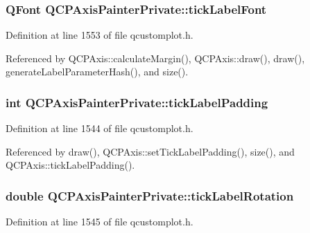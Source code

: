 \subsubsection[{tick\+Label\+Font}]{\setlength{\rightskip}{0pt plus 5cm}Q\+Font Q\+C\+P\+Axis\+Painter\+Private\+::tick\+Label\+Font}\label{class_q_c_p_axis_painter_private_a06cb4b185feb1e560e01d65887e4d80d}


Definition at line 1553 of file qcustomplot.\+h.



Referenced by Q\+C\+P\+Axis\+::calculate\+Margin(), Q\+C\+P\+Axis\+::draw(), draw(), generate\+Label\+Parameter\+Hash(), and size().

\hypertarget{class_q_c_p_axis_painter_private_a264cfa080e84e536cf2d1ab9c5d5cc5f}{}
\subsubsection[{tick\+Label\+Padding}]{\setlength{\rightskip}{0pt plus 5cm}int Q\+C\+P\+Axis\+Painter\+Private\+::tick\+Label\+Padding}\label{class_q_c_p_axis_painter_private_a264cfa080e84e536cf2d1ab9c5d5cc5f}


Definition at line 1544 of file qcustomplot.\+h.



Referenced by draw(), Q\+C\+P\+Axis\+::set\+Tick\+Label\+Padding(), size(), and Q\+C\+P\+Axis\+::tick\+Label\+Padding().

\hypertarget{class_q_c_p_axis_painter_private_ae6ade9232a8e400924009e8edca94bac}{}
\subsubsection[{tick\+Label\+Rotation}]{\setlength{\rightskip}{0pt plus 5cm}double Q\+C\+P\+Axis\+Painter\+Private\+::tick\+Label\+Rotation}\label{class_q_c_p_axis_painter_private_ae6ade9232a8e400924009e8edca94bac}


Definition at line 1545 of file qcustomplot.\+h.



